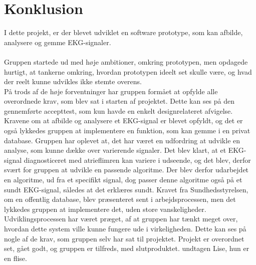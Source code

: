\chapter{Konklusion}
I dette projekt, er der blevet udviklet en software prototype, som kan afbilde, analysere og gemme EKG-signaler. \\\\
Gruppen startede ud med høje ambitioner, omkring prototypen, men opdagede hurtigt, at tankerne omkring, hvordan prototypen ideelt set skulle være, og hvad der reelt kunne udvikles ikke stemte overens. \\
På trods af de høje forventninger har gruppen formået at opfylde alle overordnede krav, som blev sat i starten af projektet. Dette kan ses på den gennemførte accepttest, som kun havde en enkelt designrelateret afvigelse. Kravene om at afbilde og analysere et EKG-signal er blevet opfyldt, og det er også lykkedes gruppen at implementere en funktion, som kan gemme i en privat database. 
Gruppen har oplevet at, det har været en udfordring at udvikle en analyse, som kunne dække over varierende signaler. Det blev klart, at et EKG-signal diagnosticeret med atrieflimren kan variere i udseende, og det blev, derfor svært for gruppen at udvikle en passende algoritme. Der blev derfor udarbejdet en algoritme, ud fra et specifikt signal, dog passer denne algoritme også på et sundt EKG-signal, således at det erklæres sundt. 
Kravet fra Sundhedsstyrelsen, om en offentlig database, blev præsenteret sent i arbejdsprocessen, men det lykkedes gruppen at implementere det, uden store vanskeligheder. 
Udviklingsprocessen har været præget, af at gruppen har tænkt meget over, hvordan dette system ville kunne fungere ude i virkeligheden. Dette kan ses på nogle af de krav, som gruppen selv har sat til projektet. 
Projekt er overordnet set, gået godt, og gruppen er tilfreds, med slutproduktet.
undtagen Lise, hun er en flise. 
